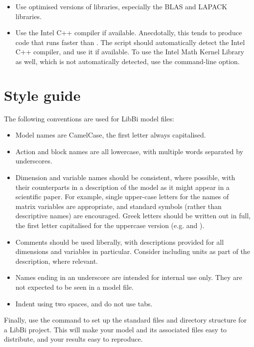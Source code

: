 \begin{itemize}
\item Use optimised versions of libraries, especially the BLAS and
  LAPACK libraries.

\item Use the Intel C++ compiler if
  available. Anecdotally, this tends to produce code that runs faster than
  . The  script should automatically
  detect the Intel C++ compiler, and use it if available. To
  use the Intel Math Kernel Library as well, which is not automatically
  detected, use the  command-line option.

\end{itemize}

\section{Style guide\label{Style_guide}}

The following conventions are used for LibBi model files:
\begin{itemize}
\item Model names are CamelCase, the first letter always capitalised.
\item Action and block names are all lowercase, with multiple words separated
  by underscores.
\item Dimension and variable names should be consistent, where possible, with
  their counterparts in a description of the model as it might appear in a
  scientific paper. For example, single upper-case letters for the names of
  matrix variables are appropriate, and standard symbols (rather
  than descriptive names) are encouraged. Greek letters should be written out
  in full, the first letter capitalised for the uppercase version
  (e.g.  and ).
\item Comments should be used liberally, with descriptions provided for all
  dimensions and variables in particular. Consider including units as part of
  the description, where relevant.
\item Names ending in an underscore are intended for internal use only. They
  are not expected to be seen in a model file.
\item Indent using two spaces, and do not use tabs.
\end{itemize}

Finally, use the  command to set up the standard files and
directory structure for a LibBi project. This will make your model and its
associated files easy to distribute, and your results easy to reproduce.
